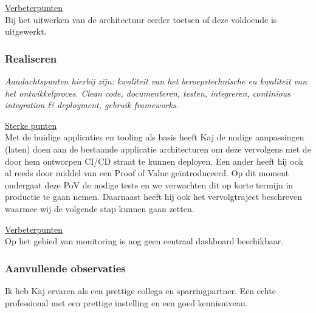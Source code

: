 \underline{Verbeterpunten}\\[0.1cm]
Bij het uitwerken van de architectuur eerder toetsen of deze voldoende is uitgewerkt.


\subsubsection{Realiseren}
\textit{Aandachtspunten hierbij zijn: kwaliteit van het beroepstechnische  en kwaliteit van het ontwikkelproces. Clean code, documenteren, testen, integreren, continious integration \& deployment, gebruik frameworks.}

\underline{Sterke punten}\\[0.1cm]
Met de huidige applicaties en tooling als basis heeft Kaj de nodige aanpassingen (laten) doen aan de bestaande applicatie architecturen om deze vervolgens met de door hem ontworpen CI/CD straat te kunnen deployen. Een ander heeft hij ook al reeds door middel van een Proof of Value geïntroduceerd. Op dit moment ondergaat deze PoV de nodige tests en we verwachten dit op korte termijn in productie te gaan nemen. Daarnaast heeft hij ook het vervolgtraject beschreven waarmee wij de volgende stap kunnen gaan zetten.

\underline{Verbeterpunten}\\[0.1cm]
Op het gebied van monitoring is nog geen centraal dashboard beschikbaar.


\subsubsection{Aanvullende observaties}
Ik heb Kaj ervaren als een prettige collega en sparringpartner. Een echte professional met een prettige instelling en een goed kennisniveau. 
